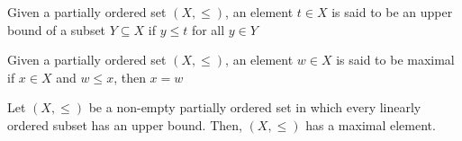 \documentclass{article}
\begin{document}
\begin{definition}
    Given a partially ordered set $(X, \leq)$, an element $t \in X$ is said to be an upper bound of a subset $Y \subseteq X$ if $y \leq t$ for all $y \in Y$
\end{definition}

\begin{definition}[Maximal]
    Given a partially ordered set $(X, \leq)$, an element $w \in X$ is said to be maximal if $x \in X$ and $w \leq x$, then $x = w$
\end{definition}





\begin{axiom}
    Let $(X, \leq)$ be a non-empty partially ordered set in which every linearly ordered subset has an upper bound. Then, $(X, \leq)$ has a maximal element.
\end{axiom}
\end{document}
